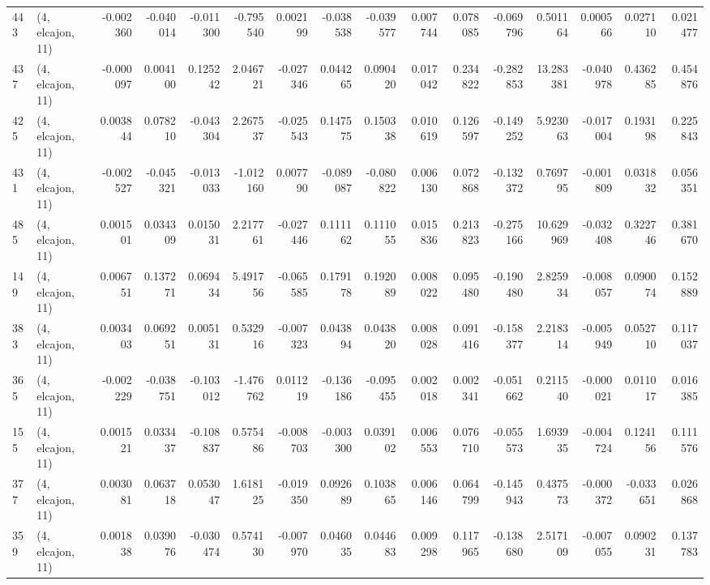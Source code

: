 \begin{tabular}{llrrrrrrrrrrrrrr}
443 &  (4, elcajon, 11) &  -0.002360 & -0.040014 & -0.011300 &   -0.795540 &  0.002199 &  -0.038538 & -0.039577 &  0.007744 &  0.078085 & -0.069796 &    0.501164 &  0.000566 &  0.027110 &  0.021477 \\
437 &  (4, elcajon, 11) &  -0.000097 &  0.004100 &  0.125242 &    2.046721 & -0.027346 &   0.044265 &  0.090420 &  0.017042 &  0.234822 & -0.282853 &   13.283381 & -0.040978 &  0.436285 &  0.454876 \\
425 &  (4, elcajon, 11) &   0.003844 &  0.078210 & -0.043304 &    2.267537 & -0.025543 &   0.147575 &  0.150338 &  0.010619 &  0.126597 & -0.149252 &    5.923063 & -0.017004 &  0.193198 &  0.225843 \\
431 &  (4, elcajon, 11) &  -0.002527 & -0.045321 & -0.013033 &   -1.012160 &  0.007790 &  -0.089087 & -0.080822 &  0.006130 &  0.072868 & -0.132372 &    0.769795 & -0.001809 &  0.031832 &  0.056351 \\
485 &  (4, elcajon, 11) &   0.001501 &  0.034309 &  0.015031 &    2.217761 & -0.027446 &   0.111162 &  0.111055 &  0.015836 &  0.213823 & -0.275166 &   10.629969 & -0.032408 &  0.322746 &  0.381670 \\
149 &  (4, elcajon, 11) &   0.006751 &  0.137271 &  0.069434 &    5.491756 & -0.065585 &   0.179178 &  0.192089 &  0.008022 &  0.095480 & -0.190480 &    2.825934 & -0.008057 &  0.090074 &  0.152889 \\
383 &  (4, elcajon, 11) &   0.003403 &  0.069251 &  0.005131 &    0.532916 & -0.007323 &   0.043894 &  0.043820 &  0.008028 &  0.091416 & -0.158377 &    2.218314 & -0.005949 &  0.052710 &  0.117037 \\
365 &  (4, elcajon, 11) &  -0.002229 & -0.038751 & -0.103012 &   -1.476762 &  0.011219 &  -0.136186 & -0.095455 &  0.002018 &  0.002341 & -0.051662 &    0.211540 & -0.000021 &  0.011017 &  0.016385 \\
155 &  (4, elcajon, 11) &   0.001521 &  0.033437 & -0.108837 &    0.575486 & -0.008703 &  -0.003300 &  0.039102 &  0.006553 &  0.076710 & -0.055573 &    1.693935 & -0.004724 &  0.124156 &  0.111576 \\
377 &  (4, elcajon, 11) &   0.003081 &  0.063718 &  0.053047 &    1.618125 & -0.019350 &   0.092689 &  0.103865 &  0.006146 &  0.064799 & -0.145943 &    0.437573 & -0.000372 & -0.033651 &  0.026868 \\
359 &  (4, elcajon, 11) &   0.001838 &  0.039076 & -0.030474 &    0.574130 & -0.007970 &   0.046035 &  0.044683 &  0.009298 &  0.117965 & -0.138680 &    2.517109 & -0.007055 &  0.090231 &  0.137783 \\

\end{tabular}
